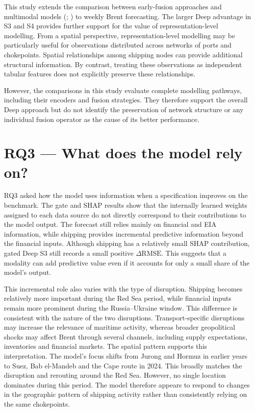 \documentclass[
  british,
  12pt,
  oneside]{book}
\begin{document}
This study extends the comparison between early-fusion approaches and multimodal models (; ) to weekly Brent forecasting. The larger Deep advantage in S3 and S4 provides further support for the value of representation-level modelling. From a spatial perspective, representation-level modelling may be particularly useful for observations distributed across networks of ports and chokepoints. Spatial relationships among shipping nodes can provide additional structural information. By contrast, treating these observations as independent tabular features does not explicitly preserve these relationships.

However, the comparisons in this study evaluate complete modelling pathways, including their encoders and fusion strategies. They therefore support the overall Deep approach but do not identify the preservation of network structure or any individual fusion operator as the cause of its better performance.

\section{RQ3 --- What does the model rely on?}\label{discussion-rq3}

RQ3 asked how the model uses information when a specification improves on the benchmark. The gate and SHAP results show that the internally learned weights assigned to each data source do not directly correspond to their contributions to the model output. The forecast still relies mainly on financial and EIA information, while shipping provides incremental predictive information beyond the financial inputs. Although shipping has a relatively small SHAP contribution, gated Deep S3 still records a small positive \(\Delta\mathrm{RMSE}\). This suggests that a modality can add predictive value even if it accounts for only a small share of the model's output.

This incremental role also varies with the type of disruption. Shipping becomes relatively more important during the Red Sea period, while financial inputs remain more prominent during the Russia--Ukraine window. This difference is consistent with the nature of the two disruptions. Transport-specific disruptions may increase the relevance of maritime activity, whereas broader geopolitical shocks may affect Brent through several channels, including supply expectations, inventories and financial markets. The spatial pattern supports this interpretation. The model's focus shifts from Jurong and Hormuz in earlier years to Suez, Bab el-Mandeb and the Cape route in 2024. This broadly matches the disruption and rerouting around the Red Sea. However, no single location dominates during this period. The model therefore appears to respond to changes in the geographic pattern of shipping activity rather than consistently relying on the same chokepoints.
\end{document}
